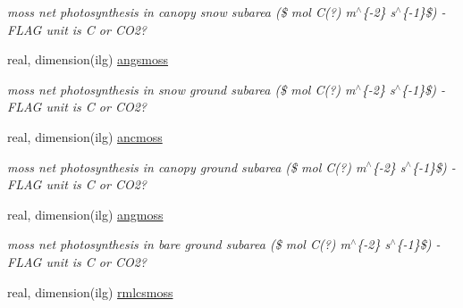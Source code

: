 \begin{DoxyCompactItemize}
\begin{DoxyCompactList}\small\item\em moss net photosynthesis in canopy snow subarea (\$ mol C(?) m$^\wedge$\{-\/2\} s$^\wedge$\{-\/1\}\$) -\/ F\+L\+A\+G unit is C or C\+O2? \end{DoxyCompactList}\item 
\hypertarget{structctem__statevars_1_1veg__gat_a5ace9e04d5066c0e1d96d77705a3b2d1}{}real, dimension(ilg) \hyperlink{structctem__statevars_1_1veg__gat_a5ace9e04d5066c0e1d96d77705a3b2d1}{angsmoss}\label{structctem__statevars_1_1veg__gat_a5ace9e04d5066c0e1d96d77705a3b2d1}

\begin{DoxyCompactList}\small\item\em moss net photosynthesis in snow ground subarea (\$ mol C(?) m$^\wedge$\{-\/2\} s$^\wedge$\{-\/1\}\$) -\/ F\+L\+A\+G unit is C or C\+O2? \end{DoxyCompactList}\item 
\hypertarget{structctem__statevars_1_1veg__gat_ad0719e0bacf49feb3220b223e064c3a6}{}real, dimension(ilg) \hyperlink{structctem__statevars_1_1veg__gat_ad0719e0bacf49feb3220b223e064c3a6}{ancmoss}\label{structctem__statevars_1_1veg__gat_ad0719e0bacf49feb3220b223e064c3a6}

\begin{DoxyCompactList}\small\item\em moss net photosynthesis in canopy ground subarea (\$ mol C(?) m$^\wedge$\{-\/2\} s$^\wedge$\{-\/1\}\$) -\/ F\+L\+A\+G unit is C or C\+O2? \end{DoxyCompactList}\item 
\hypertarget{structctem__statevars_1_1veg__gat_a4dba5c3219b9a00eb9703d3a0e17a4d0}{}real, dimension(ilg) \hyperlink{structctem__statevars_1_1veg__gat_a4dba5c3219b9a00eb9703d3a0e17a4d0}{angmoss}\label{structctem__statevars_1_1veg__gat_a4dba5c3219b9a00eb9703d3a0e17a4d0}

\begin{DoxyCompactList}\small\item\em moss net photosynthesis in bare ground subarea (\$ mol C(?) m$^\wedge$\{-\/2\} s$^\wedge$\{-\/1\}\$) -\/ F\+L\+A\+G unit is C or C\+O2? \end{DoxyCompactList}\item 
\hypertarget{structctem__statevars_1_1veg__gat_a67762db2e026c84ab4c1f888d1a716a1}{}real, dimension(ilg) \hyperlink{structctem__statevars_1_1veg__gat_a67762db2e026c84ab4c1f888d1a716a1}{rmlcsmoss}\label{structctem__statevars_1_1veg__gat_a67762db2e026c84ab4c1f888d1a716a1}


\end{DoxyCompactItemize}
